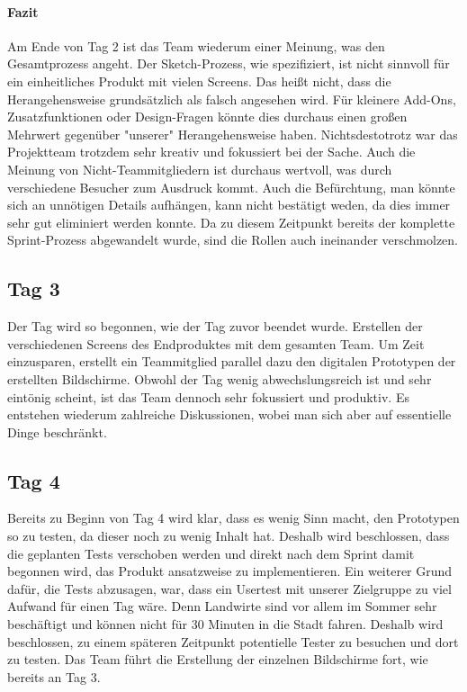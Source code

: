 \paragraph{Fazit}
Am Ende von Tag 2 ist das Team wiederum einer Meinung, was den Gesamtprozess angeht. Der Sketch-Prozess, wie spezifiziert, ist nicht sinnvoll für ein einheitliches Produkt mit vielen Screens. Das heißt nicht, dass die Herangehensweise grundsätzlich als falsch angesehen wird. Für kleinere Add-Ons, Zusatzfunktionen oder Design-Fragen könnte dies durchaus einen großen Mehrwert gegenüber "unserer" Herangehensweise haben. Nichtsdestotrotz war das Projektteam trotzdem sehr kreativ und fokussiert bei der Sache. Auch die Meinung von Nicht-Teammitgliedern ist durchaus wertvoll, was durch verschiedene Besucher zum Ausdruck kommt. Auch die Befürchtung, man könnte sich an unnötigen Details aufhängen, kann nicht bestätigt weden, da dies immer sehr gut eliminiert werden konnte. Da zu diesem Zeitpunkt bereits der komplette Sprint-Prozess abgewandelt wurde, sind die Rollen auch ineinander verschmolzen.

\subsection*{Tag 3}
Der Tag wird so begonnen, wie der Tag zuvor beendet wurde. Erstellen der verschiedenen Screens des Endproduktes mit dem gesamten Team. Um Zeit einzusparen, erstellt ein Teammitglied parallel dazu den digitalen Prototypen der erstellten Bildschirme. Obwohl der Tag wenig abwechslungsreich ist und sehr eintönig scheint, ist das Team dennoch sehr fokussiert und produktiv. Es entstehen wiederum zahlreiche Diskussionen, wobei man sich aber auf essentielle Dinge beschränkt.

\subsection*{Tag 4}
Bereits zu Beginn von Tag 4 wird klar, dass es wenig Sinn macht, den Prototypen so zu testen, da dieser noch zu wenig Inhalt hat. Deshalb wird beschlossen, dass die geplanten Tests verschoben werden und direkt nach dem Sprint damit begonnen wird, das Produkt ansatzweise zu implementieren. Ein weiterer Grund dafür, die Tests abzusagen, war, dass ein Usertest mit unserer Zielgruppe zu viel Aufwand für einen Tag wäre. Denn Landwirte sind vor allem im Sommer sehr beschäftigt und können nicht für 30 Minuten in die Stadt fahren. Deshalb wird beschlossen, zu einem späteren Zeitpunkt potentielle Tester zu besuchen und dort zu testen. Das Team führt die Erstellung der einzelnen Bildschirme fort, wie bereits an Tag 3.

